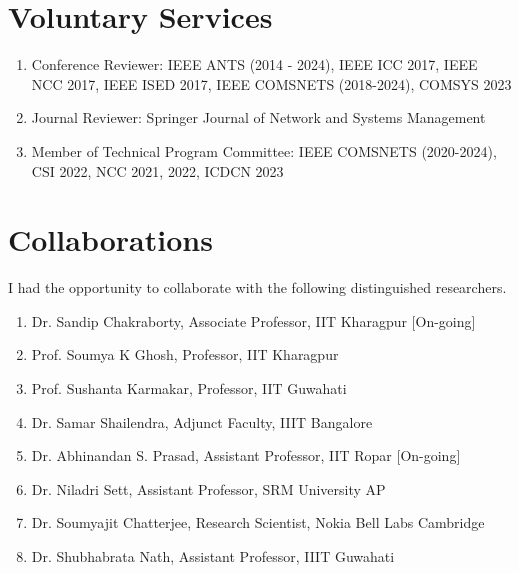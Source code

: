 \documentclass{article}
\begin{document}
\section{Voluntary Services}
  \begin{enumerate}
   \item Conference Reviewer: IEEE ANTS (2014 - 2024), IEEE ICC 2017, IEEE NCC 2017, IEEE ISED 2017, IEEE COMSNETS (2018-2024), COMSYS 2023
   \item Journal Reviewer: Springer Journal of Network and Systems Management
   \item Member of Technical Program Committee: IEEE  COMSNETS (2020-2024), CSI 2022, NCC 2021, 2022, ICDCN 2023
  \end{enumerate}
\section{Collaborations}
I had the opportunity to collaborate with the following distinguished researchers.
  \begin{enumerate}
  	\item Dr. Sandip Chakraborty, Associate Professor, IIT Kharagpur [On-going]
	\item Prof. Soumya K Ghosh, Professor, IIT Kharagpur
	\item Prof. Sushanta Karmakar, Professor, IIT Guwahati
	\item Dr. Samar Shailendra, Adjunct Faculty, IIIT Bangalore
	\item Dr. Abhinandan S. Prasad, Assistant Professor, IIT Ropar [On-going]
	\item Dr. Niladri Sett, Assistant Professor, SRM University AP
	\item Dr. Soumyajit Chatterjee, Research Scientist, Nokia Bell Labs Cambridge
	\item Dr. Shubhabrata Nath, Assistant Professor, IIIT Guwahati
  \end{enumerate}
\end{document}

